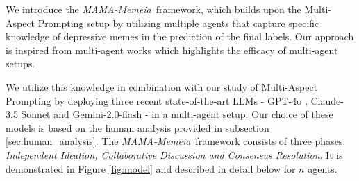 \documentclass[letterpaper]{article} %
\newcommand{\model}{\textit{MAMA-Memeia}}
\begin{document}
We introduce the \model\ framework, which builds upon the Multi-Aspect Prompting setup by utilizing multiple agents that capture specific knowledge of depressive memes in the prediction of the final labels. Our approach is inspired from multi-agent works \citep{wu2024autogen, 10.5555/3692070.3692537, chen-etal-2024-reconcile}
which highlights the efficacy of multi-agent setups. 

We utilize this knowledge in combination with our study of Multi-Aspect Prompting by deploying three recent state-of-the-art LLMs - GPT-4o \cite{openai2024gpt4ocard}, Claude-3.5 Sonnet \cite{claude} and Gemini-2.0-flash \cite{geminiteam2024geminifamilyhighlycapable} - in a multi-agent setup. Our choice of these models is based on the human analysis provided in subsection \ref{sec:human_analysis}. The \model\ framework consists of three phases: \textit{Independent Ideation, Collaborative Discussion and Consensus Resolution}. It is demonstrated in Figure \ref{fig:model} and described in detail below for $n$ agents.
\end{document}
